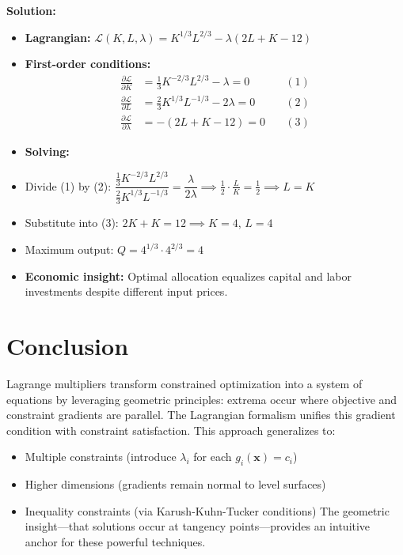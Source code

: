 \documentclass{article}
\begin{document}
\textbf{Solution:}
\begin{itemize}
\item \textbf{Lagrangian:} $\mathcal{L}(K,L,\lambda) = K^{1/3} L^{2/3} - \lambda (2L + K - 12)$
    \item \textbf{First-order conditions:}
    \[
    \begin{aligned}
    \frac{\partial \mathcal{L}}{\partial K} &= \tfrac{1}{3} K^{-2/3} L^{2/3} - \lambda = 0 \quad &(1)\\
    \frac{\partial \mathcal{L}}{\partial L} &= \tfrac{2}{3} K^{1/3} L^{-1/3} - 2\lambda = 0 \quad &(2)\\
    \frac{\partial \mathcal{L}}{\partial \lambda} &= -(2L + K - 12) = 0 \quad &(3)
    \end{aligned}
    \]
    \item \textbf{Solving:}
        \item Divide (1) by (2): $\dfrac{ \tfrac{1}{3} K^{-2/3} L^{2/3} }{ \tfrac{2}{3} K^{1/3} L^{-1/3} } = \dfrac{\lambda}{2\lambda} \implies \tfrac{1}{2} \cdot \tfrac{L}{K} = \tfrac{1}{2} \implies L = K$
        \item Substitute into (3): $2K + K = 12 \implies K = 4$, $L = 4$
        \item Maximum output: $Q = 4^{1/3} \cdot 4^{2/3} = 4$
    \item \textbf{Economic insight:} Optimal allocation equalizes capital and labor investments despite different input prices.
\end{itemize}

\section*{Conclusion}
Lagrange multipliers transform constrained optimization into a system of equations by leveraging geometric principles: extrema occur where objective and constraint gradients are parallel. The Lagrangian formalism unifies this gradient condition with constraint satisfaction. This approach generalizes to:
\begin{itemize}
\item Multiple constraints (introduce $\lambda_i$ for each $g_i(\mathbf{x}) = c_i$)
    \item Higher dimensions (gradients remain normal to level surfaces)
    \item Inequality constraints (via Karush-Kuhn-Tucker conditions)
The geometric insight—that solutions occur at tangency points—provides an intuitive anchor for these powerful techniques.
\end{itemize}
\end{document}
